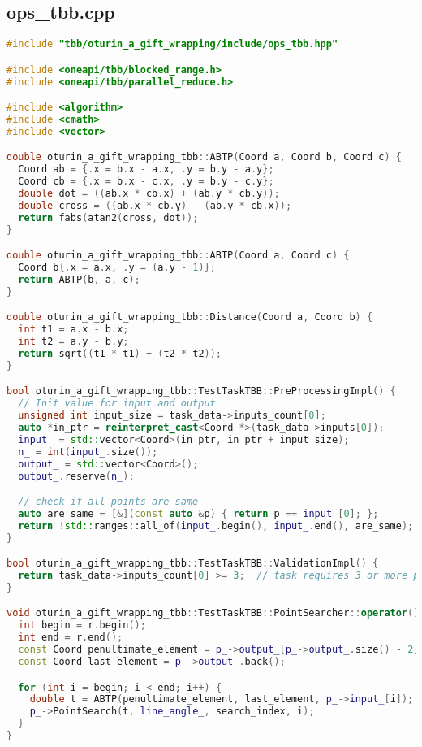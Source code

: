 \documentclass[12pt,a4paper]{extarticle}
\begin{document}
\subsection{ops\_tbb.cpp}
\label{sec:tbb.cpp}
\begin{lstlisting}[language=C++]
#include "tbb/oturin_a_gift_wrapping/include/ops_tbb.hpp"

#include <oneapi/tbb/blocked_range.h>
#include <oneapi/tbb/parallel_reduce.h>

#include <algorithm>
#include <cmath>
#include <vector>

double oturin_a_gift_wrapping_tbb::ABTP(Coord a, Coord b, Coord c) {
  Coord ab = {.x = b.x - a.x, .y = b.y - a.y};
  Coord cb = {.x = b.x - c.x, .y = b.y - c.y};
  double dot = ((ab.x * cb.x) + (ab.y * cb.y));
  double cross = ((ab.x * cb.y) - (ab.y * cb.x));
  return fabs(atan2(cross, dot));
}

double oturin_a_gift_wrapping_tbb::ABTP(Coord a, Coord c) {
  Coord b{.x = a.x, .y = (a.y - 1)};
  return ABTP(b, a, c);
}

double oturin_a_gift_wrapping_tbb::Distance(Coord a, Coord b) {
  int t1 = a.x - b.x;
  int t2 = a.y - b.y;
  return sqrt((t1 * t1) + (t2 * t2));
}

bool oturin_a_gift_wrapping_tbb::TestTaskTBB::PreProcessingImpl() {
  // Init value for input and output
  unsigned int input_size = task_data->inputs_count[0];
  auto *in_ptr = reinterpret_cast<Coord *>(task_data->inputs[0]);
  input_ = std::vector<Coord>(in_ptr, in_ptr + input_size);
  n_ = int(input_.size());
  output_ = std::vector<Coord>();
  output_.reserve(n_);

  // check if all points are same
  auto are_same = [&](const auto &p) { return p == input_[0]; };
  return !std::ranges::all_of(input_.begin(), input_.end(), are_same);
}

bool oturin_a_gift_wrapping_tbb::TestTaskTBB::ValidationImpl() {
  return task_data->inputs_count[0] >= 3;  // task requires 3 or more points to wrap
}

void oturin_a_gift_wrapping_tbb::TestTaskTBB::PointSearcher::operator()(const tbb::blocked_range<int> &r) {
  int begin = r.begin();
  int end = r.end();
  const Coord penultimate_element = p_->output_[p_->output_.size() - 2];
  const Coord last_element = p_->output_.back();

  for (int i = begin; i < end; i++) {
    double t = ABTP(penultimate_element, last_element, p_->input_[i]);
    p_->PointSearch(t, line_angle_, search_index, i);
  }
}


\end{lstlisting}
\end{document}
